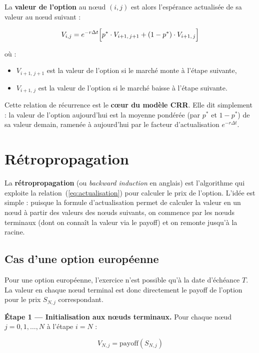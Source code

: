 \documentclass[11pt]{report}
\begin{document}
\medskip

La \textbf{valeur de l'option} au nœud $(i, j)$ est alors l'espérance
actualisée de sa valeur au nœud suivant :

\begin{equation}
    V_{i,j} = e^{-r \Delta t} \Bigl[ p^* \cdot V_{i+1,\, j+1}
              + (1 - p^*) \cdot V_{i+1,\, j} \Bigr]
    \label{eq:actualisation}
\end{equation}

où :
\begin{itemize}[noitemsep]
    \item $V_{i+1,\, j+1}$ est la valeur de l'option si le marché monte à
          l'étape suivante,
    \item $V_{i+1,\, j}$ est la valeur de l'option si le marché baisse à
          l'étape suivante.
\end{itemize}

Cette relation de récurrence est le \textbf{cœur du modèle CRR}. Elle dit
simplement : la valeur de l'option aujourd'hui est la moyenne pondérée (par
$p^*$ et $1-p^*$) de sa valeur demain, ramenée à aujourd'hui par le facteur
d'actualisation $e^{-r\Delta t}$.

\section{Rétropropagation}

La \textbf{rétropropagation} (ou \textit{backward induction} en anglais)
est l'algorithme qui exploite la relation~(\ref{eq:actualisation}) pour
calculer le prix de l'option. L'idée est simple : puisque la formule
d'actualisation permet de calculer la valeur en un nœud à partir des
valeurs des nœuds suivants, on commence par les nœuds terminaux (dont on
connaît la valeur via le payoff) et on remonte jusqu'à la racine.

\subsection{Cas d'une option européenne}

Pour une option européenne, l'exercice n'est possible qu'à la date
d'échéance $T$. La valeur en chaque nœud terminal est donc directement
le payoff de l'option pour le prix $S_{N,j}$ correspondant.

\textbf{Étape 1 — Initialisation aux nœuds terminaux.}
Pour chaque nœud $j = 0, 1, \ldots, N$ à l'étape $i = N$ :

\begin{equation}
    V_{N,j} = \text{payoff}(S_{N,j})
\end{equation}
\end{document}
